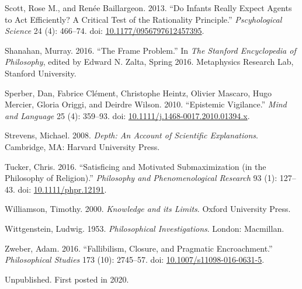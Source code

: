 \documentclass[
  11pt,
  letterpaper,
  DIV=11,
  numbers=noendperiod,
  twoside]{scrartcl}
\newlength{\cslhangindent}
\newenvironment{CSLReferences}[2] %
 {\begin{list}{}{%
  \setlength{\itemindent}{0pt}
  \setlength{\leftmargin}{0pt}
  \setlength{\parsep}{0pt}
  \ifodd #1
   \setlength{\leftmargin}{\cslhangindent}
   \setlength{\itemindent}{-1\cslhangindent}
  \fi
  \setlength{\itemsep}{#2\baselineskip}}}
 {\end{list}}
\begin{document}
\begin{CSLReferences}{1}{0}
Scott, Rose M., and Renée Baillargeon. 2013. {``Do Infants Really Expect
Agents to Act Efficiently? A Critical Test of the Rationality
Principle.''} \emph{Pscyhological Science} 24 (4): 466--74. doi:
\href{https://doi.org/10.1177/0956797612457395}{10.1177/0956797612457395}.

Shanahan, Murray. 2016. {``The Frame Problem.''} In \emph{The Stanford
Encyclopedia of Philosophy}, edited by Edward N. Zalta, Spring 2016.
Metaphysics Research Lab, Stanford University.

Sperber, Dan, Fabrice Clément, Christophe Heintz, Olivier Mascaro, Hugo
Mercier, Gloria Origgi, and Deirdre Wilson. 2010. {``Epistemic
Vigilance.''} \emph{Mind and Language} 25 (4): 359--93. doi:
\href{https://doi.org/10.1111/j.1468-0017.2010.01394.x}{10.1111/j.1468-0017.2010.01394.x}.

Strevens, Michael. 2008. \emph{Depth: An Account of Scientific
Explanations}. Cambridge, MA: Harvard University Press.

Tucker, Chris. 2016. {``Satisficing and Motivated Submaximization (in
the Philosophy of Religion).''} \emph{Philosophy and Phenomenological
Research} 93 (1): 127--43. doi:
\href{https://doi.org/10.1111/phpr.12191}{10.1111/phpr.12191}.

Williamson, Timothy. 2000. \emph{{Knowledge and its Limits}}. Oxford
University Press.

Wittgenstein, Ludwig. 1953. \emph{Philosophical Investigations}. London:
Macmillan.

Zweber, Adam. 2016. {``Fallibilism, Closure, and Pragmatic
Encroachment.''} \emph{Philosophical Studies} 173 (10): 2745--57. doi:
\href{https://doi.org/10.1007/s11098-016-0631-5}{10.1007/s11098-016-0631-5}.

\end{CSLReferences}



\noindent Unpublished. First posted in 2020.
\end{document}
